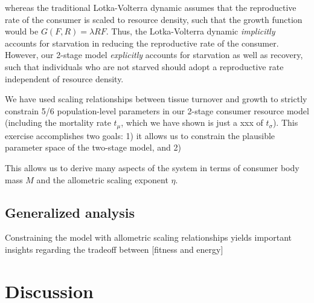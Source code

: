 \documentclass[12pt,english]{article}
\begin{document}
\begin{spacing}{1.9}
 whereas the traditional Lotka-Volterra dynamic assumes that the reproductive rate of the consumer is scaled to resource density, such that the growth function would be $G(F,R) = \lambda R F$.
Thus, the Lotka-Volterra dynamic \emph{implicitly} accounts for starvation in reducing the reproductive rate of the consumer.
However, our 2-stage model \emph{explicitly} accounts for starvation as well as recovery, such that individuals who are not starved should adopt a reproductive rate independent of resource density.



We have used scaling relationships between tissue turnover and growth to strictly constrain 5/6 population-level parameters in our 2-stage consumer resource model (including the mortality rate $t_\mu$, which we have shown is just a xxx of $t_\sigma$).
This exercise accomplishes two goals:
1) it allows us to constrain the plausible parameter space of the two-stage model, and 
2) 

This allows us to derive many aspects of the system in terms of consumer body mass $M$ and the allometric scaling exponent $\eta$.



\subsection{Generalized analysis}
Constraining the model with allometric scaling relationships yields important insights regarding the tradeoff between [fitness and energy]





\section{Discussion}





\end{spacing}
\end{document}
